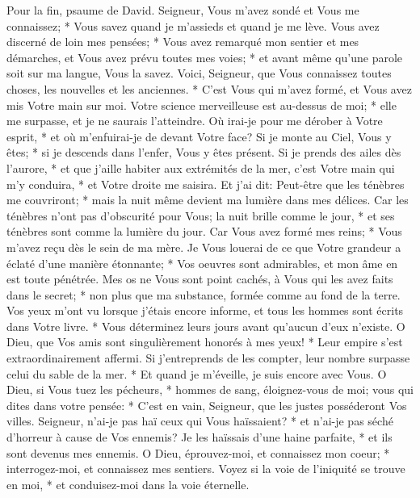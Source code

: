 Pour la fin, psaume de David. Seigneur, Vous m'avez sondé et Vous me connaissez; *
Vous savez quand je m'assieds et quand je me lève.
Vous avez discerné de loin mes pensées; * Vous avez remarqué mon sentier et mes démarches,
et Vous avez prévu toutes mes voies; * et avant même qu'une parole soit sur ma langue, Vous la savez.
Voici, Seigneur, que Vous connaissez toutes choses, les nouvelles et les anciennes. * C'est Vous qui m'avez formé, et Vous avez mis Votre main sur moi.
Votre science merveilleuse est au-dessus de moi; * elle me surpasse, et je ne saurais l'atteindre.
Où irai-je pour me dérober à Votre esprit, * et où m'enfuirai-je de devant Votre face?
Si je monte au Ciel, Vous y êtes; * si je descends dans l'enfer, Vous y êtes présent.
Si je prends des ailes dès l'aurore, * et que j'aille habiter aux extrémités de la mer,
c'est Votre main qui m'y conduira, * et Votre droite me saisira.
Et j'ai dit: Peut-être que les ténèbres me couvriront; * mais la nuit même devient ma lumière dans mes délices.
Car les ténèbres n'ont pas d'obscurité pour Vous; la nuit brille comme le jour, * et ses ténèbres sont comme la lumière du jour.
Car Vous avez formé mes reins; * Vous m'avez reçu dès le sein de ma mère.
Je Vous louerai de ce que Votre grandeur a éclaté d'une manière étonnante; * Vos oeuvres sont admirables, et mon âme en est toute pénétrée.
Mes os ne Vous sont point cachés, à Vous qui les avez faits dans le secret; * non plus que ma substance, formée comme au fond de la terre.
Vos yeux m'ont vu lorsque j'étais encore informe, et tous les hommes sont écrits dans Votre livre. * Vous déterminez leurs jours avant qu'aucun d'eux n'existe.
O Dieu, que Vos amis sont singulièrement honorés à mes yeux! * Leur empire s'est extraordinairement affermi.
Si j'entreprends de les compter, leur nombre surpasse celui du sable de la mer. * Et quand je m'éveille, je suis encore avec Vous.
O Dieu, si Vous tuez les pécheurs, * hommes de sang, éloignez-vous de moi;
vous qui dites dans votre pensée: * C'est en vain, Seigneur, que les justes posséderont Vos villes.
Seigneur, n'ai-je pas haï ceux qui Vous haïssaient? * et n'ai-je pas séché d'horreur à cause de Vos ennemis?
Je les haïssais d'une haine parfaite, * et ils sont devenus mes ennemis.
O Dieu, éprouvez-moi, et connaissez mon coeur; * interrogez-moi, et connaissez mes sentiers.
Voyez si la voie de l'iniquité se trouve en moi, * et conduisez-moi dans la voie éternelle.

